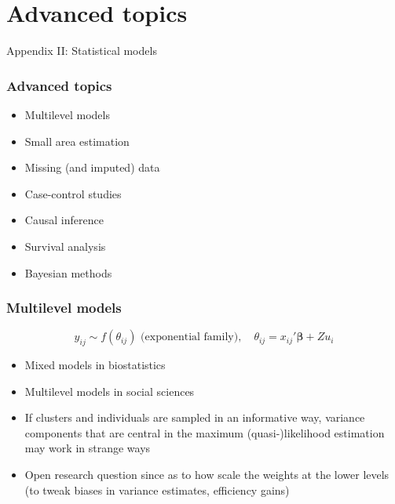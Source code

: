 \documentclass[handout]{beamer}
\begin{document}
\section{Advanced topics}

\begin{frame}

\centering

\Large Appendix II: Statistical models

\end{frame}



\begin{frame}\frametitle{Advanced topics}

\begin{itemize}
    \item Multilevel models
    \item Small area estimation
    \item Missing (and imputed) data
    \item Case-control studies
    \item Causal inference
    \item Survival analysis
    \item Bayesian methods
\end{itemize}

\end{frame}


\begin{frame}\frametitle{Multilevel models}

$$
y_{ij} \sim f(\theta_{ij}) \mbox{ (exponential family)}, \quad \theta_{ij} = x_{ij}'\mathbf{\beta}  + Z u_i
$$

\begin{itemize}
    \item Mixed models in biostatistics
    \item Multilevel models in social sciences
    \item If clusters and individuals are sampled in an informative way,
        variance components that are central in the maximum (quasi-)likelihood estimation
        may work in strange ways
    \item Open research question since \citet{pfef:skin:holm:gold:rasb:1998} as to how
        scale the weights at the lower levels (to tweak biases in variance estimates, efficiency gains)
\end{itemize}

\end{frame}
\end{document}

